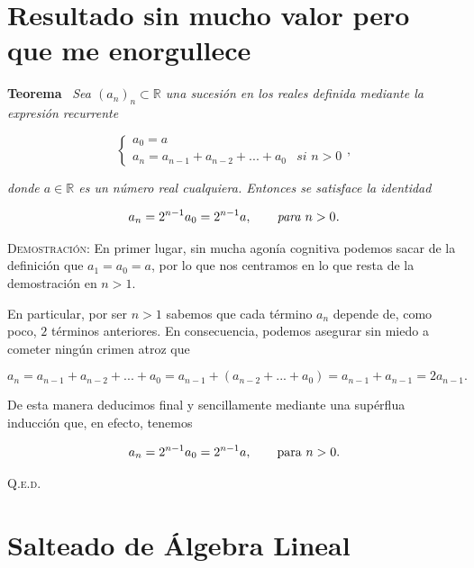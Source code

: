 \documentclass{article}
\begin{document}
\newpage

\section{Resultado sin mucho valor pero que me enorgullece}

\textbf{Teorema} \, \textit{Sea $(a_n)_n \subset \mathbb{R}$ una sucesión en los reales definida mediante la expresión recurrente}

\[
\begin{cases}
    a_0 = a \\
    a_n = a_{n - 1} + a_{n - 2} + ... + a_0 & \textit{si $n > 0$}
\end{cases},
\]

\noindent \textit{donde $a \in \mathbb{R}$ es un número real cualquiera. Entonces se satisface la identidad}

\[a_n = 2^{n - 1}a_0 = 2^{n - 1}a, \hspace{20px} \textit{para $n > 0$.}\]

\vspace{10px}

\noindent \textsc{Demostración}: En primer lugar, sin mucha agonía cognitiva podemos sacar de la definición que $a_1 = a_0 = a$, por lo que nos centramos en lo que resta de la demostración en $n > 1$.

En particular, por ser $n > 1$ sabemos que cada término $a_n$ depende de, como poco, $2$ términos anteriores. En consecuencia, podemos asegurar sin miedo a cometer ningún crimen atroz que

\[a_n = a_{n - 1} + a_{n - 2} + ... + a_0 = a_{n - 1} + (a_{n - 2} + ... + a_0) = a_{n - 1} + a_{n - 1} = 2a_{n - 1}.\]

\noindent De esta manera deducimos final y sencillamente mediante una supérflua inducción que, en efecto, tenemos

\[a_n = 2^{n - 1}a_0 = 2^{n - 1}a, \hspace{20px} \text{para $n > 0$.}\]

\hfill{\textsc{Q.e.d.}}

\newpage

\section{Salteado de Álgebra Lineal}
\end{document}
